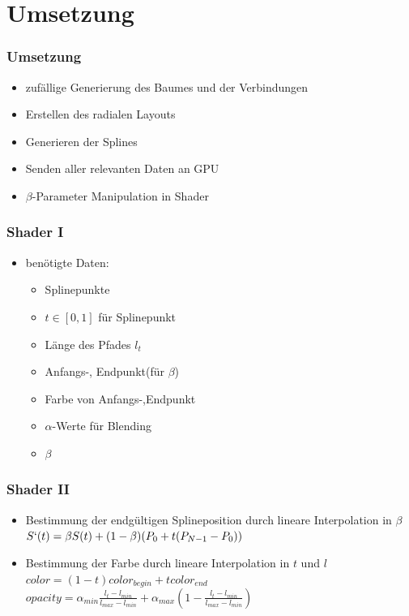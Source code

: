 \documentclass[11pt]{beamer}
\begin{document}
\section{Umsetzung}
\begin{frame}
\frametitle{Umsetzung}

\begin{itemize}
\item zufällige Generierung des Baumes und der Verbindungen
\item Erstellen des radialen Layouts
\item Generieren der Splines
\item Senden aller relevanten Daten an GPU
\item $\beta$-Parameter Manipulation in Shader
\end{itemize}
\end{frame}

\begin{frame}
\frametitle{Shader I}
\begin{itemize}
\item benötigte Daten: 	
	\begin{itemize}
	\item Splinepunkte
	\item $t \in[0,1]$ für Splinepunkt
	\item Länge des Pfades $l_t$
	\item Anfangs-, Endpunkt(für $\beta$)
	\item Farbe von Anfangs-,Endpunkt
	\item $\alpha$-Werte für Blending
	\item $\beta$
	\end{itemize}
\end{itemize}

\end{frame}

\begin{frame}
\frametitle{Shader II}
\begin{itemize}
\item Bestimmung der endgültigen Splineposition durch lineare Interpolation in $\beta$\\
$S`(t)=\beta S(t) + (1-\beta)(P_0 + t(P_{N-1} - P_0))$

\item Bestimmung der Farbe durch lineare Interpolation in $t$ und $l$
$color =(1-t) color_{begin} + t color_{end}$
$opacity = \alpha_{min} \frac{l_t-l_{min}}{l_{max}-l_{min}} + \alpha_{max} (1-\frac{l_t-l_{min}}{l_{max}-l_{min}})$
\end{itemize}
\end{frame}
\end{document}
